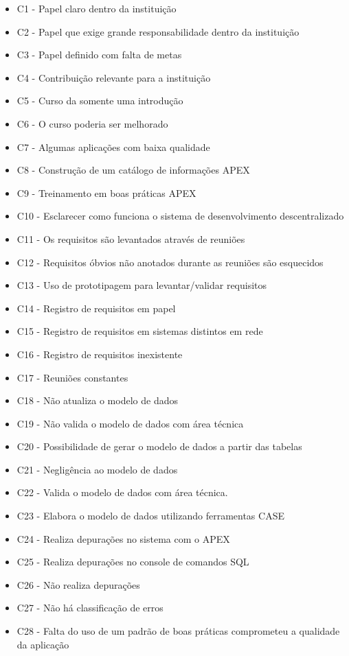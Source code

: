 \begin{itemize}
\item C1 - Papel claro dentro da instituição
\item C2 - Papel que exige grande responsabilidade dentro da instituição
\item C3 - Papel definido com falta de metas
\item C4 - Contribuição relevante para a instituição
\item C5 - Curso da somente uma introdução
\item C6 - O curso poderia ser melhorado
\item C7 - Algumas aplicações com baixa qualidade
\item C8 - Construção de um catálogo de informações APEX
\item C9 - Treinamento em boas práticas APEX
\item C10 - Esclarecer como funciona o sistema de desenvolvimento descentralizado
\item C11 - Os requisitos são levantados através de reuniões
\item C12 - Requisitos óbvios não anotados durante as reuniões são esquecidos
\item C13 - Uso de prototipagem para levantar/validar requisitos
\item C14 - Registro de requisitos em papel
\item C15 - Registro de requisitos em sistemas distintos em rede
\item C16 - Registro de requisitos inexistente
\item C17 - Reuniões constantes
\item C18 - Não atualiza o modelo de dados
\item C19 - Não valida o modelo de dados com área técnica
\item C20 - Possibilidade de gerar o modelo de dados a partir das tabelas
\item C21 - Negligência ao modelo de dados
\item C22 - Valida o modelo de dados com área técnica.
\item C23 - Elabora o modelo de dados utilizando ferramentas CASE
\item C24 - Realiza depurações no sistema com o APEX
\item C25 - Realiza depurações no console de comandos SQL
\item C26 - Não realiza depurações
\item C27 - Não há classificação de erros
\item C28 - Falta do uso de um padrão de boas práticas comprometeu a qualidade da aplicação

\end{itemize}
